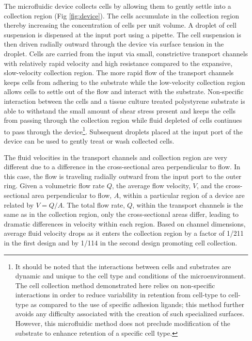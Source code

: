 The microfluidic device collects cells by allowing them to gently settle into a collection region (Fig \ref{fig:device}). The cells accumulate in the collection region thereby increasing the concentration of cells per unit volume. A droplet of cell suspension is dispensed at the input port using a pipette. The cell suspension is then driven radially outward through the device via surface tension in the droplet\cite{Berthier:2007mi,Chen:2009df}. Cells are carried from the input via small, constrictive transport channels with relatively rapid velocity and high resistance compared to the expansive, slow-velocity collection region. The more rapid flow of the transport channels keeps cells from adhering to the substrate while the low-velocity collection region allows cells to settle out of the flow and interact with the substrate. Non-specific interaction between the cells and a tissue culture treated polystyrene substrate is able to withstand the small amount of shear stress present and keeps the cells from passing through the collection region while fluid depleted of cells continues to pass through the device\footnote{It should be noted that the interactions between cells and substrates are dynamic and unique to the cell type and conditions of the microenvironment. The cell collection method demonstrated here relies on non-specific interactions in order to reduce variability in retention from cell-type to cell-type as compared to the use of specific adhesion ligands; this method further avoids any difficulty associated with the creation of such specialized surfaces. However, this microfluidic method does not preclude modification of the substrate to enhance retention of a specific cell type.}. Subsequent droplets placed at the input port of the device can be used to gently treat or wash collected cells.

The fluid velocities in the transport channels and collection region are very different due to a difference in the cross-sectional area perpendicular to flow. In this case, the flow is traveling radially outward from the input port to the outer ring. Given a volumetric flow rate $Q$, the average flow velocity, $V$, and the cross-sectional area perpendicular to flow, $A$, within a particular region of a device are related by $V=Q/A$. The total flow rate, $Q$, within the transport channels is the same as in the collection region, only the cross-sectional areas differ, leading to dramatic differences in velocity within each region. Based on channel dimensions, average fluid velocity drops as it enters the collection region by a factor of 1/211 in the first design and by 1/114 in the second design promoting cell collection.

